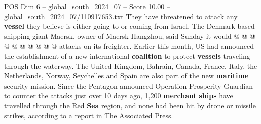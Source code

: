 \begin{textsample}{POS Dim 6 – global\_south\_2024\_07 – Score 10.00 – global\_south\_2024\_07/110917653.txt}
They have threatened to attack any \textbf{vessel} they believe is either going to or coming from Israel.
The Denmark-based shipping giant Maersk, owner of Maersk Hangzhou, said Sunday it would @ @ @ @ @ @ @ @ @ @ attacks on its freighter.
Earlier this month, US had announced the establishment of a new international \textbf{coalition} to protect \textbf{vessels} traveling through the waterway.
The United Kingdom, Bahrain, Canada, France, Italy, the Netherlands, Norway, Seychelles and Spain are also part of the new \textbf{maritime} security mission.
Since the Pentagon announced Operation Prosperity Guardian to counter the attacks just over 10 days ago, 1,200 \textbf{merchant} \textbf{ships} have travelled through the Red \textbf{Sea} region, and none had been hit by drone or missile strikes, according to a report in The Associated Press.

\end{textsample}
